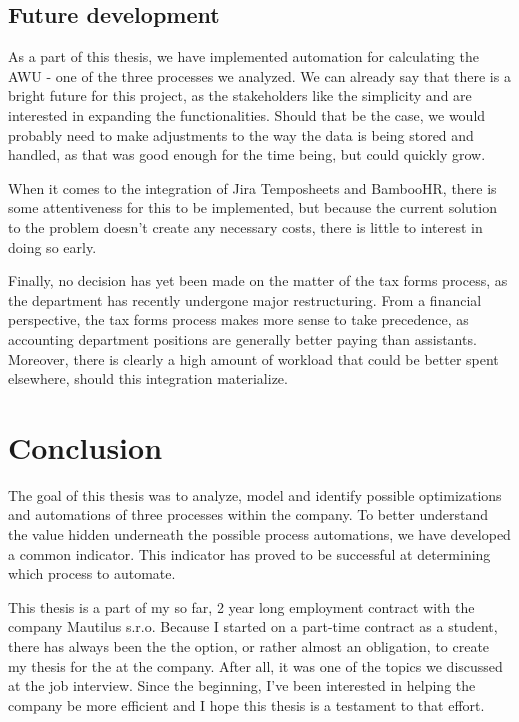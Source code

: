\documentclass[12pt,oneside]{fithesis2}
\begin{document}
\section{Future development}
As a part of this thesis, we have implemented automation for calculating the AWU - one of the three processes we analyzed. We can already say that there is a bright future for this project, as the stakeholders like the simplicity and are interested in expanding the functionalities. Should that be the case, we would probably need to make adjustments to the way the data is being stored and handled, as that was good enough for the time being, but could quickly grow.

When it comes to the integration of Jira Temposheets and BambooHR, there is some attentiveness for this to be implemented, but because the current solution to the problem doesn't create any necessary costs, there is little to interest in doing so early.

Finally, no decision has yet been made on the matter of the tax forms process, as the department has recently undergone major restructuring. From a financial perspective, the tax forms process makes more sense to take precedence, as accounting department positions are generally better paying than assistants. Moreover, there is clearly a high amount of workload that could be better spent elsewhere, should this integration materialize.

\chapter{Conclusion}
The goal of this thesis was to analyze, model and identify possible optimizations and automations of three processes within the company. To better understand the value hidden underneath the possible process automations, we have developed a common indicator. This indicator has proved to be successful at determining which process to automate.

This thesis is a part of my so far, 2 year long employment contract with the company Mautilus s.r.o. Because I started on a part-time contract as a student, there has always been the the option, or rather almost an obligation, to create my thesis for the at the company. After all, it was one of the topics we discussed at the job interview. Since the beginning, I've been interested in helping the company be more efficient and I hope this thesis is a testament to that effort.


\listoffigures
\end{document}
